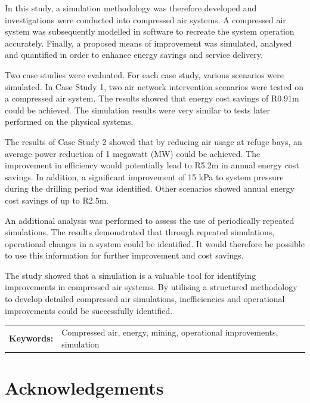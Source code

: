 \documentclass[12pt, english, oneside]{report}%
\begin{document}
	\par
In this study, a simulation methodology was therefore developed and investigations were conducted into compressed air systems. A compressed air system was subsequently modelled in software to recreate the system operation accurately. Finally, a proposed means of improvement was simulated, analysed and quantified in order to enhance energy savings and service delivery.
	 \par
Two case studies were evaluated. For each case study, various scenarios were simulated. In Case Study 1, two air network intervention scenarios were tested on a compressed air system. The results showed that energy cost savings of R0.91m could be achieved. The simulation results were very similar to tests later performed on the physical systems.
	 \par 
The results of Case Study 2 showed that by reducing air usage at refuge bays, an average power reduction of 1 megawatt (MW) could be achieved. The improvement in efficiency would potentially lead to R5.2m in annual energy cost savings. In addition, a significant improvement of 15 kPa to system pressure during the drilling period was identified. Other scenarios showed annual energy cost savings of up to R2.5m.
	 \par 
An additional analysis was performed to assess the use of periodically repeated simulations. The results demonstrated that through repeated simulations, operational changes in a system could be identified. It would therefore be possible to use this information for further improvement and cost savings.
	 \par
The study showed that a simulation is a valuable tool for identifying improvements in compressed air systems. By utilising a structured methodology to develop detailed compressed air simulations, inefficiencies and operational improvements could be successfully identified.
	 \par
	\begin{tabular}{p{}p{}}
		\textbf{Keywords:} & Compressed air, energy, mining, operational improvements, simulation  \\
	\end{tabular}
\clearpage

{\tiny }\section*{Acknowledgements}
\thispagestyle{plain}
\vspace{0.2cm}
\clearpage
\end{document}
